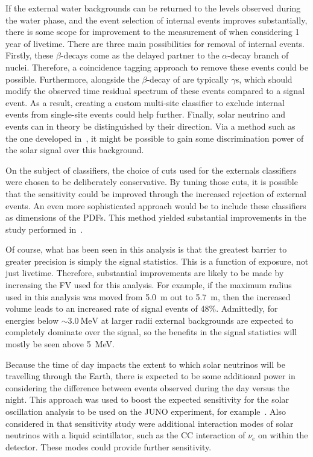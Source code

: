 If the external water backgrounds can be returned to the levels observed during the water phase, and the event selection of internal  events improves substantially, there is some scope for improvement to the measurement of \tonetwo{} when considering 1 year of livetime. There are three main possibilities for removal of internal  events. Firstly, these $\beta$-decays come as the delayed partner to the $\alpha$-decay branch of  nuclei. Therefore, a coincidence tagging approach to remove these events could be possible. Furthermore, alongside the $\beta$-decay of  are typically $\gamma$s, which should modify the observed time residual spectrum of these events compared to a \beight{} signal event. As a result, creating a custom multi-site classifier to exclude internal  events from single-site events could help further. Finally, solar neutrino and  events can in theory be distinguished by their direction. Via a method such as the one developed in~\cite{allegaEventbyEventDirectionReconstruction2023,patonDirectionalReconstructionLiquid2023}, %
it might be possible to gain some discrimination power of the solar signal over this background.

On the subject of classifiers, the choice of cuts used for the externals classifiers were chosen to be deliberately conservative. By tuning those cuts, it is possible that the sensitivity could be improved through the increased rejection of external events. An even more sophisticated approach would be to include these classifiers as dimensions of the PDFs. This method yielded substantial improvements in the \onbb{} study performed in~\cite{kroupovaImprovingSensitivityNeutrinoless2020}.

Of course, what has been seen in this analysis is that the greatest barrier to greater precision is simply the signal statistics. This is a function of exposure, not just livetime. Therefore, substantial improvements are likely to be made by increasing the FV used for this analysis. For example, if the maximum radius used in this analysis was moved from \SI{5.0}{\metre} out to \SI{5.7}{\metre}, then the increased volume leads to an increased rate of signal events of 48\%. Admittedly, for energies below $\sim\SI{3.0}{\MeV}$ at larger radii external backgrounds are expected to completely dominate over the signal, so the benefits in the signal statistics will mostly be seen above \SI{5}{\MeV}.

Because the time of day impacts the extent to which solar neutrinos will be travelling through the Earth, there is expected to be some additional power in considering the difference between events observed during the day versus the night. This approach was used to boost the expected sensitivity for the solar oscillation analysis to be used on the JUNO experiment, for example~\cite{abuslemeFeasibilityPhysicsPotential2020,zhaoModelIndependentApproach2022}. %
Also considered in that sensitivity study were additional interaction modes of solar neutrinos with a liquid scintillator, such as the CC interaction of $\nu_{e}$ on  within the detector. These modes could provide further sensitivity.

